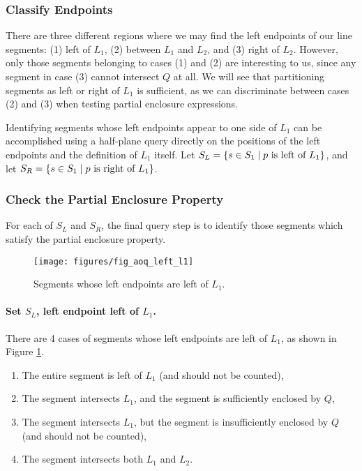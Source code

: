 \subsubsection{Classify Endpoints}
\label{:slabs:one:details:classify}

There are three different regions where we may find the left endpoints of our line segments: (1) left of $L_1$, (2) between $L_1$ and $L_2$, and (3) right of $L_2$.
However, only those segments belonging to cases (1) and (2) are interesting to us, since any segment in case (3) cannot intersect $Q$ at all. 
We will see that partitioning segments as left or right of $L_1$ is sufficient, as we can discriminate between cases (2) and (3) when testing partial enclosure expressions.

Identifying segments whose left endpoints appear to one side of $L_1$ can be accomplished using a half-plane query directly on the positions of the left endpoints and the definition of $L_1$ itself.
Let $S_L = \{ s \in S_1 \;|\; p \text{ is left of } L_1 \}$, and let $S_R = \{ s \in S_1 \;|\; p \text{ is right of } L_1 \}$.


\subsubsection{Check the Partial Enclosure Property}
\label{:slabs:one:details:pep}

For each of $S_L$ and $S_R$, the final query step is to identify those segments which satisfy the partial enclosure property.

\begin{figure}[t]
\begin{center}
  \texttt{[image: figures/fig\_aoq\_left\_l1]}
  \caption{Segments whose left endpoints are left of $L_1$.}
  \label{fig:slabs:one:aoq_left_l1}
\end{center}
\end{figure}

\paragraph{Set $S_L$, left endpoint left of $L_1$.} There are 4 cases of segments whose left endpoints are left of $L_1$, as shown in Figure \ref{fig:slabs:one:aoq_left_l1}.

\begin{enumerate}
 \item The entire segment is left of $L_1$ (and should not be counted),

 \item The segment intersects $L_1$, and the segment is sufficiently enclosed by $Q$,

 \item The segment intersects $L_1$, but the segment is insufficiently enclosed by $Q$ (and should not be counted),

 \item The segment intersects both $L_1$ and $L_2$. 

\end{enumerate}

